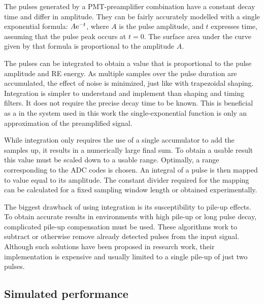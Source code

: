 The pulses generated by a PMT-preamplifier combination
have a constant decay time and differ in amplitude.
They can be fairly accurately modelled with a 
single exponential formula: $A {\rm e}^{-t}$, where $A$ is
the pulse amplitude, and $t$ expresses time, assuming that 
the pulse peak occurs at $t=0$. The surface area
under the curve given by that formula is proportional 
to the amplitude $A$.


The pulses can be integrated to obtain a value that is proportional
to the pulse amplitude and RE energy. As multiple samples
over the pulse duration are accumulated, the effect of noise
is minimized, just like with trapezoidal shaping.
Integration is simpler to understand and implement
than shaping and timing filters. It does not require
the precise decay time to be known. This is beneficial 
as a in the system used in this work the 
single-exponential function is only an approximation 
of the preamplified signal.


While integration only requires the use of a single accumulator 
to add the samples up, it results in a numerically large final sum. 
To obtain a usable result this value must be scaled down to a usable range.
Optimally, a range corresponding to the ADC codes is chosen.
An integral of a pulse is then mapped to value equal to its amplitude.
The constant divider required for the mapping
can be calculated for a fixed sampling window length
or obtained experimentally. 


The biggest drawback of using integration is its 
susceptibility to pile-up effects. To obtain accurate results
in environments with high pile-up or long pulse decay, complicated 
pile-up compensation must be used. These algorithms 
work to subtract or otherwise remove already detected pulses
from the input signal.
Although such solutions have been proposed in research work,
their implementation is expensive and usually limited to a single
pile-up of just two pulses. \cite{pileup_correction}

\subsection{Simulated performance}
